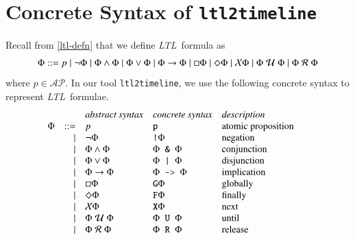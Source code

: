 \documentclass[preprint,12pt]{elsarticle}
\theoremstyle{definition}
\theoremstyle{remark}
\newcommand{\AP}{\mathcal{AP}}
\newcommand{\always}{\Box}
\newcommand{\eventually}{\Diamond}
\newcommand{\nextt}{\mathcal{X}}
\newcommand{\limplies}{\rightarrow}
\newcommand{\ltl}{\textit{LTL}}
\newcommand{\stronguntil}{\hspace{0.1cm} \mathcal{U}  \hspace{0.1cm}}
\newcommand{\weakrelease}{\hspace{0.1cm} \mathcal{R} \hspace{0.1cm}}
\newcommand{\tool}{\hspace{0.1cm}\texttt{ltl2timeline}\hspace{0.1cm}}
\begin{document}
\section{Concrete Syntax of \tool} \label{sec:concrete-syntax}
Recall from \ref{ltl-defn} that we define \ltl\ formula as
\begin{align*}
    \Phi ::= p \mid \neg \Phi \mid \Phi \land \Phi \mid \Phi \lor \Phi \mid \Phi \limplies \Phi \mid \always \Phi \mid \eventually \Phi \mid \nextt \Phi \mid \Phi \stronguntil \Phi \mid \Phi \weakrelease \Phi
\end{align*}
where $p \in \AP$. In our tool \tool, we use the following concrete syntax to represent \ltl\ formulae.
\[
    \begin{array}{c r l l l@{\qquad} l}
         &      & \textit{abstract syntax}              & \textit{concrete syntax}                       & \textit{description} \\
    \Phi & ::=  & p                                     & \texttt{p}                                     & \text{atomic proposition} \\
         & \mid & \neg \Phi                             & \texttt{!} \Phi                                & \text{negation} \\
         & \mid & \Phi \land \Phi                       & \Phi \texttt{ \& } \Phi                        & \text{conjunction} \\
         & \mid & \Phi \lor \Phi                        & \Phi \texttt{ | } \Phi                         & \text{disjunction} \\
         & \mid & \Phi \limplies \Phi                   & \Phi \texttt{ -> } \Phi                        & \text{implication} \\
         & \mid & \always \Phi                          & \texttt{G} \Phi                                & \text{globally} \\
         & \mid & \eventually \Phi                      & \texttt{F} \Phi                                & \text{finally} \\
         & \mid & \nextt \Phi                           & \texttt{X} \Phi                                & \text{next} \\
         & \mid & \Phi \stronguntil \Phi                & \Phi \texttt{ U } \Phi                         & \text{until} \\
         & \mid & \Phi \weakrelease \Phi                & \Phi \texttt{ R } \Phi                         & \text{release} \\
    \end{array}
\]


\end{document}
